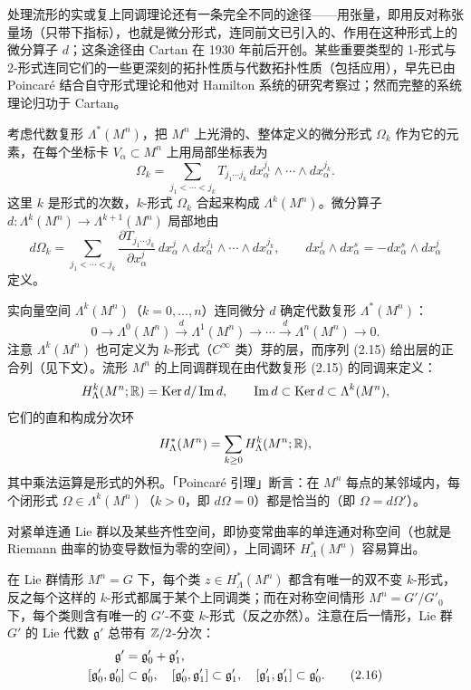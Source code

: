 处理流形的实或复上同调理论还有一条完全不同的途径——用张量，即用反对称张量场（只带下指标），也就是微分形式，连同前文已引入的、作用在这种形式上的微分算子 $d$；这条途径由 Cartan 在 1930 年前后开创。某些重要类型的 1-形式与 2-形式连同它们的一些更深刻的拓扑性质与代数拓扑性质（包括应用），早先已由 Poincaré 结合自守形式理论和他对 Hamilton 系统的研究考察过；然而完整的系统理论归功于 Cartan。

考虑代数复形 $\Lambda^*(M^n)$，把 $M^n$ 上光滑的、整体定义的微分形式 $\Omega_k$ 作为它的元素，在每个坐标卡 $V_\alpha\subset M^n$ 上用局部坐标表为
\[
  \Omega_k=\sum_{j_1<\cdots<j_k}T_{j_1\cdots j_k}\,dx_\alpha^{j_1}\wedge\cdots\wedge dx_\alpha^{j_k}.
\]
这里 $k$ 是形式的次数，$k$-形式 $\Omega_k$ 合起来构成 $\Lambda^k(M^n)$。微分算子 $d:\Lambda^k(M^n)\to\Lambda^{k+1}(M^n)$ 局部地由
\begin{equation}
  d\Omega_k=\sum_{j_1<\cdots<j_k}\frac{\partial T_{j_1\cdots j_k}}{\partial x_\alpha^j}
  \,dx_\alpha^j\wedge dx_\alpha^{j_1}\wedge\cdots\wedge dx_\alpha^{j_k},\qquad
  dx_\alpha^j\wedge dx_\alpha^s=-dx_\alpha^s\wedge dx_\alpha^j \tag{2.14}
\end{equation}
定义。

实向量空间 $\Lambda^k(M^n)$（$k=0,\ldots,n$）连同微分 $d$ 确定代数复形 $\Lambda^*(M^n)$：
\begin{equation}
  0\longrightarrow\Lambda^0(M^n)\stackrel{d}{\longrightarrow}\Lambda^1(M^n)
  \longrightarrow\cdots\stackrel{d}{\longrightarrow}\Lambda^n(M^n)\longrightarrow0. \tag{2.15}
\end{equation}
注意 $\Lambda^k(M^n)$ 也可定义为 $k$-形式（$C^\infty$ 类）芽的层，而序列 (2.15) 给出层的正合列（见下文）。流形 $M^n$ 的上同调群现在由代数复形 (2.15) 的同调来定义：
\[
  H^k_\Lambda(M^n;\mathbb{R})=\operatorname{Ker} d/\operatorname{Im} d,\qquad
  \operatorname{Im} d\subset\operatorname{Ker} d\subset\Lambda^k(M^n),
\]
它们的直和构成分次环
\[
  H^*_\Lambda(M^n)=\sum_{k\ge0}H^k_\Lambda(M^n;\mathbb{R}),
\]
其中乘法运算是形式的外积。「Poincaré 引理」断言：在 $M^n$ 每点的某邻域内，每个闭形式 $\Omega\in\Lambda^k(M^n)$（$k>0$，即 $d\Omega=0$）都是恰当的（即 $\Omega=d\Omega'$）。

对紧单连通 Lie 群以及某些齐性空间，即协变常曲率的单连通对称空间（也就是 Riemann 曲率的协变导数恒为零的空间），上同调环 $H^*_\Lambda(M^n)$ 容易算出。

在 Lie 群情形 $M^n=G$ 下，每个类 $z\in H^*_\Lambda(M^n)$ 都含有唯一的双不变 $k$-形式，反之每个这样的 $k$-形式都属于某个上同调类；而在对称空间情形 $M^n=G'/G'_0$ 下，每个类则含有唯一的 $G'$-不变 $k$-形式（反之亦然）。注意在后一情形，Lie 群 $G'$ 的 Lie 代数 $\mathfrak{g}'$ 总带有 $\mathbb{Z}/2$-分次：
\begin{align}
  \mathfrak{g}'&=\mathfrak{g}'_0+\mathfrak{g}'_1,\notag\\
  [\mathfrak{g}'_0,\mathfrak{g}'_0]&\subset\mathfrak{g}'_0,\quad
  [\mathfrak{g}'_0,\mathfrak{g}'_1]\subset\mathfrak{g}'_1,\quad
  [\mathfrak{g}'_1,\mathfrak{g}'_1]\subset\mathfrak{g}'_0. \tag{2.16}
\end{align}

